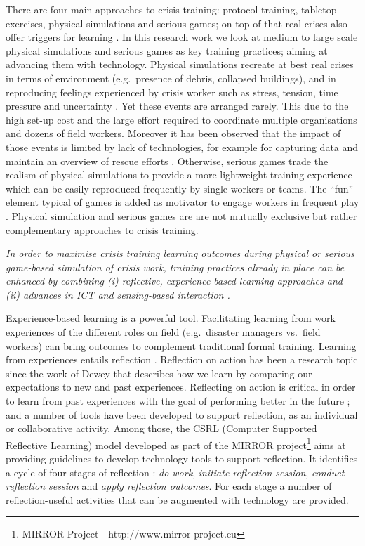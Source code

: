There are four main approaches to crisis training: protocol training, tabletop exercises, physical simulations and serious games; on top of that real crises also offer triggers for learning \autocite{Deverell:2009fk}. In this research work we look at medium to large scale physical simulations and serious games as key training practices; aiming at advancing them with technology. Physical simulations recreate at best real crises in terms of environment (e.g.~presence of debris, collapsed buildings), and in reproducing feelings experienced by crisis worker such as stress, tension, time pressure and uncertainty \autocite{Borodzicz:2002em}. Yet these events are arranged rarely. This due to the high set-up cost and the large effort required to coordinate multiple organisations and dozens of field workers. Moreover it has been observed that the impact of those events is limited by lack of technologies, for example for capturing data and maintain an overview of rescue efforts \autocite{Kyng:2006he}. Otherwise, serious games trade the realism of physical simulations to provide a more lightweight training experience which can be easily reproduced frequently by single workers or teams. The ``fun'' element typical of games is added as motivator to engage workers in frequent play \autocite{DiLoreto:2012jj}. Physical simulation and serious games are are not mutually exclusive but rather complementary approaches to crisis training.

\emph{In order to maximise crisis training learning outcomes during physical or serious game-based simulation of crisis work, training practices already in place can be enhanced by combining (i) reflective, experience-based learning approaches and (ii) advances in ICT and sensing-based interaction \autocite{Zhai:2005jm}.}

Experience-based learning is a powerful tool. Facilitating learning from work experiences of the different roles on field (e.g.~disaster managers vs.~field workers) can bring outcomes to complement traditional formal training. Learning from experiences entails reflection \autocites{boud1985reflection}{Dewey:1998ug}{kolb1974toward}. Reflection on action has been a research topic since the work of Dewey \autocite{dewey1933we} that describes how we learn by comparing our expectations to new and past experiences. Reflecting on action is critical in order to learn from past experiences with the goal of performing better in the future \autocites{boud1985reflection}{Schon:1983ut}; and a number of tools have been developed to support reflection, as an individual or collaborative activity. Among those, the CSRL (Computer Supported Reflective Learning) model developed as part of the MIRROR project\footnote{MIRROR Project - http://www.mirror-project.eu} aims at providing guidelines to develop technology tools to support reflection. It identifies a cycle of four stages of reflection \autocite{Krogstie:2013kf}: \emph{do work}, \emph{initiate reflection session}, \emph{conduct reflection session} and \emph{apply reflection outcomes}. For each stage a number of reflection-useful activities that can be augmented with technology are provided.

